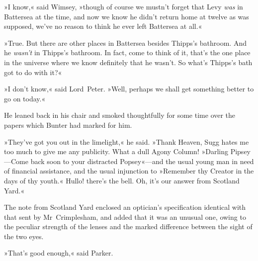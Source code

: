 »I know,« said Wimsey, »though of course we mustn't forget that Levy \textit{was} in Battersea at the time, and now we know he didn't return home at twelve as was supposed, we've no reason to think he ever left Battersea at all.«

»True. But there are other places in Battersea besides Thipps's bathroom. And he \textit{wasn't} in Thipps's bathroom. In fact, come to think of it, that's the one place in the universe where we know definitely that he wasn't. So what's Thipps's bath got to do with it?«

»I don't know,« said Lord~Peter. »Well, perhaps we shall get something better to go on today.«

He leaned back in his chair and smoked thoughtfully for some time over the papers which Bunter had marked for him.

»They've got you out in the limelight,« he said. »Thank Heaven, Sugg hates me too much to give me any publicity. What a dull Agony Column! »Darling Pipsey—Come back soon to your distracted Popsey«---and the usual young man in need of financial assistance, and the usual injunction to »Remember thy Creator in the days of thy youth.« Hullo! there's the bell. Oh, it's our answer from Scotland Yard.«

The note from Scotland Yard enclosed an optician's specification identical with that sent by Mr~Crimplesham, and added that it was an unusual one, owing to the peculiar strength of the lenses and the marked difference between the sight of the two eyes.

»That's good enough,« said Parker.

